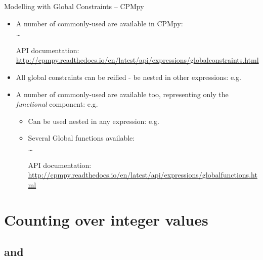 \documentclass{cons-beamer}
\begin{document}
\begin{flashcardcpmpy}
\begin{frame}{Modelling with Global Constraints -- CPMpy}
  \begin{itemize}
    \item A number of commonly-used  are available in CPMpy: \\  \dots
      \begin{footnotesize}
        API documentation: \\ \url{http://cpmpy.readthedocs.io/en/latest/api/expressions/globalconstraints.html}
      \end{footnotesize}
     \vfill
      
     \item All global constraints can be reified - be nested in other expressions: e.g. \\
    \vfill
    
    \item A number of commonly-used  are available too, representing only the \textit{functional} component: e.g. 
    \begin{itemize}
      \item Can be used nested in any expression: e.g. 
      \item Several Global functions available: \\  \dots 
        \begin{footnotesize}
          API documentation: \\ \url{http://cpmpy.readthedocs.io/en/latest/api/expressions/globalfunctions.html}
        \end{footnotesize}
    \end{itemize}
  \end{itemize}
\end{frame}
\end{flashcardcpmpy}


\section{Counting over integer values}

\subsection{ and }
\end{document}
